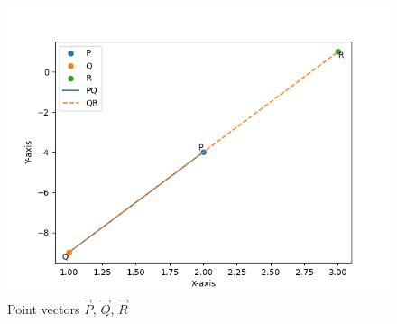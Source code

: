 \begin{enumerate}[label=\thesection.\arabic*,ref=\thesection.\theenumi]
\begin{figure}[H]
    \centering
    \includegraphics[width=\columnwidth]{figs/external-bisector.png}                                                                                                                                                                                                                                              
    \caption{Point vectors $\vec{P}$, $\vec{Q}$, $\vec{R}$}                                                                                                                                                                                                                                                       
    \label{Point vectors}                                                                                                                                                                                                                                                                                         
\end{figure} 
\end{enumerate}

